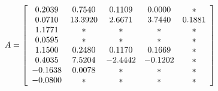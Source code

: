 \begin{table}[t!]
  \caption[Human function parameters.]{Human function parameters.
    Asterisks (*) denote no additional parameters.}
  \centering
  \begin{align*}
    A = \left[\begin{array}{c c c c c}
        0.2039 & 0.7540 & 0.1109 & 0.0000 & *\\
        0.0710 & 13.3920 & 2.6671 & 3.7440 & 0.1881\\
        1.1771 & * & * & * & *\\
        0.0595 & * & * & * & *\\
        1.1500 & 0.2480 & 0.1170 &0.1669 & *\\
        0.4035 & 7.5204 & -2.4442 & -0.1202 & *\\
        -0.1638 & 0.0078 & * & * & *\\
        -0.0800 & * & * & * & *        
      \end{array}\right]
  \end{align*}
  \label{tab:funcparam}
\end{table}
